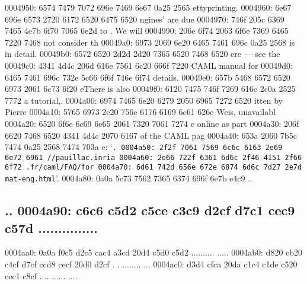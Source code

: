 \begin{bo
00010e0: 7865 647d 5c62 6567 696e 7b76 6572 6261  xed}
\begin{verba
00010f0: 7469 6d7d 0a20 2023 7479 7065 2074 6572  tim}
\begin{
0001c40: 7665 7262 6174 696d 7d0a 2020 236c 6574  verbatim}
\begin{boxe
00027a0: 647d 5c62 6567 696e 7b76 6572 6261 7469  d}
\begin{verbati
00027b0: 6d7d 0a20 2023 6c65 7420 696e 6669 7865  m}
\begin{v
0002c60: 6572 6261 7469 6d7d 0a20 2023 6c65 7420  erbatim}
\begin{
0002dc0: 7665 7262 6174 696d 7d0a 2020 236c 6574  verbatim}
\begin{boxed
0002f30: 7d5c 6265 6769 6e7b 7665 7262 6174 696d  }
\begin{verbatim
0002f40: 7d0a 2020 236c 6574 2068 6428 683a 3a74  }
\begin{v
0003e60: 6572 6261 7469 6d7d 0a20 2023 236f 7065  erbatim}
\begin{boxed
00042b0: 7d5c 6265 6769 6e7b 7665 7262 6174 696d  }
\begin{verbatim
00042c0: 7d0a 2020 2328 782c 7429 3b3b 0a20 202d  }
\begin{boxed}
0004950: 6574 7479 7072 696e 7469 6e67 0a25 2565  ettyprinting.%
0004960: 6e67 696e 6573 2720 6172 6520 6475 6520  ngines' are due 
0004970: 746f 205c 6369 7465 4e7b 6f70 7065 6e2d  to . We will
0004990: 206e 6f74 2063 6f6e 7369 6465 7220 7468   not consider th
00049a0: 6973 2069 6e20 6465 7461 696c 0a25 2568  is in detail.%
00049b0: 6572 6520 2d2d 2d20 7365 6520 7468 6520  ere --- see the 
00049c0: 4341 4d4c 206d 616e 7561 6c20 666f 7220  CAML manual for 
00049d0: 6465 7461 696c 732e 5c66 6f6f 746e 6f74  details.\footnot
00049e0: 657b 5468 6572 6520 6973 2061 6c73 6f20  e{There is also 
00049f0: 6120 7475 746f 7269 616c 2c0a 2525 7772  a tutorial,.%
0004a00: 6974 7465 6e20 6279 2050 6965 7272 6520  itten by Pierre 
0004a10: 5765 6973 2c20 756e 6176 6169 6c61 626c  Weis, unavailabl
0004a20: 6520 6f6e 6c69 6e65 2061 7320 7061 7274  e online as part
0004a30: 206f 6620 7468 6520 4341 4d4c 2070 6167   of the CAML pag
0004a40: 653a 2060 7b5c 7474 0a25 2568 7474 703a  e: `{\tt.%
0004a50: 2f2f 7061 7569 6c6c 6163 2e69 6e72 6961  //pauillac.inria
0004a60: 2e66 722f 6361 6d6c 2f46 4151 2f66 6f72  .fr/caml/FAQ/for
0004a70: 6d61 742d 656e 672e 6874 6d6c 7d27 2e7d  mat-eng.html}'.}
0004a80: 0a0a 5c73 7562 7365 6374 696f 6e7b e4c9  ..\subsection{..
0004a90: c6c6 c5d2 c5ce c3c9 d2cf d7c1 cec9 c57d  ...............}
0004aa0: 0a0a f0c5 d2c5 cac4 a3cd 20d4 c5d0 c5d2  .......... .....
0004ab0: d820 cb20 c4cf d7cf ccd8 cecf 20d0 d2cf  . . ........ ...
0004ac0: d3d4 cfca 20da c1c4 c1de c520 cec1 c8cf  .... ...... ....

\end{boxed}
\end{verbatim
00042c0: 7d0a 2020 2328 782c 7429 3b3b 0a20 202d  }
\end{boxed
00042b0: 7d5c 6265 6769 6e7b 7665 7262 6174 696d  }
\end{v
0003e60: 6572 6261 7469 6d7d 0a20 2023 236f 7065  erbatim}
\end{verbatim
0002f40: 7d0a 2020 236c 6574 2068 6428 683a 3a74  }
\end{boxed
0002f30: 7d5c 6265 6769 6e7b 7665 7262 6174 696d  }
\end{
0002dc0: 7665 7262 6174 696d 7d0a 2020 236c 6574  verbatim}
\end{v
0002c60: 6572 6261 7469 6d7d 0a20 2023 6c65 7420  erbatim}
\end{verbati
00027b0: 6d7d 0a20 2023 6c65 7420 696e 6669 7865  m}
\end{boxe
00027a0: 647d 5c62 6567 696e 7b76 6572 6261 7469  d}
\end{
0001c40: 7665 7262 6174 696d 7d0a 2020 236c 6574  verbatim}
\end{verba
00010f0: 7469 6d7d 0a20 2023 7479 7065 2074 6572  tim}
\end{bo
00010e0: 7865 647d 5c62 6567 696e 7b76 6572 6261  xed}
